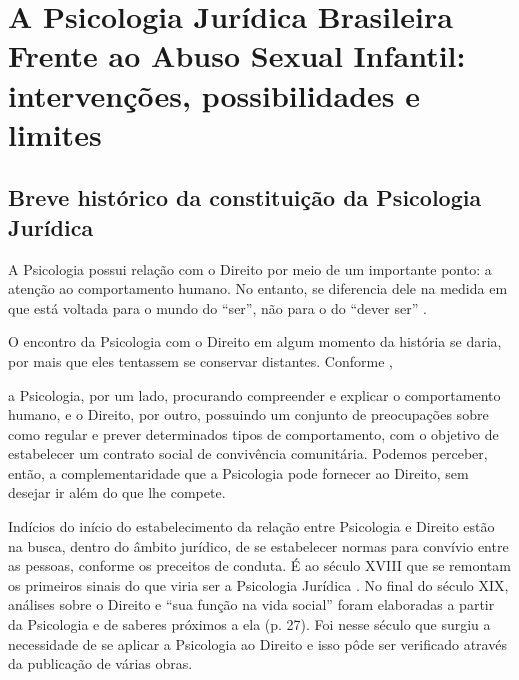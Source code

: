 
\chapter{A Psicologia Jurídica Brasileira Frente ao Abuso Sexual Infantil: intervenções, possibilidades e limites}

\section{Breve histórico da constituição da Psicologia Jurídica}

A Psicologia possui relação com o Direito por meio de um importante ponto: a atenção ao comportamento humano. No entanto, se diferencia dele na medida em que está voltada para o mundo do ``ser'', não para o do ``dever ser'' .

O encontro da Psicologia com o Direito em algum momento da história se daria, por mais que eles tentassem se conservar distantes. Conforme ,

\begin{citacao}
	a Psicologia, por um lado, procurando compreender e explicar o comportamento humano, e o Direito, por outro, possuindo um conjunto de preocupações sobre como regular e prever determinados tipos de comportamento, com o objetivo de estabelecer um contrato social de convivência comunitária. Podemos perceber, então, a complementaridade que a Psicologia pode fornecer ao Direito, sem desejar ir além do que lhe compete.
\end{citacao}

Indícios do início do estabelecimento da relação entre Psicologia e Direito estão na busca, dentro do âmbito jurídico, de se estabelecer normas para convívio entre as pessoas, conforme os preceitos de conduta. É ao século XVIII que se remontam os primeiros sinais do que viria ser a Psicologia Jurídica \cite{JESUS2001}. No final do século XIX, análises sobre o Direito e ``sua função na vida social'' foram elaboradas a partir da Psicologia e de saberes próximos a ela (p. 27). Foi nesse século que surgiu a necessidade de se aplicar a Psicologia ao Direito e isso pôde ser verificado através da publicação de várias obras.\footnotemark

